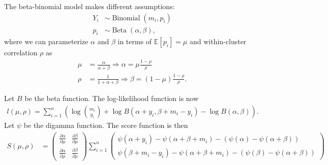 \documentclass[11pt, letterpaper]{article}
\begin{document}
\begin{enumerate}[(a)]
\begin{description}
  The beta-binomial model makes different assumptions:
  \begin{align*}
    Y_{i}
    &\sim \operatorname{Binomial}\left(m_i, p_i\right) \\
    p_i
    &\sim \operatorname{Beta}\left(\alpha, \beta\right),
  \end{align*}
  where we can parameterize $\alpha$ and $\beta$ in terms of
  $\mathbb{E}\left[p_i\right] = \mu$ and within-cluster correlation $\rho$ as
  \begin{align*}
    \mu &= \frac{\alpha}{\alpha + \beta} \Rightarrow \alpha = \mu\frac{1 - \rho}{\rho} \\
    \rho &= \frac{1}{1 + \alpha + \beta} \Rightarrow \beta = \left(1 - \mu\right)\frac{1 - \rho}{\rho}.
  \end{align*}

  Let $B$ be the beta function. The log-likelihood function is now
  \begin{align*}
    l\left(\mu, \rho\right)
    = \sum_{i=1}^n\left(\log{m_i \choose y_i}
    + \log B\left(\alpha + y_i, \beta + m_i - y_i \right)
    - \log B\left(\alpha, \beta\right)
    \right).
  \end{align*}
  Let $\psi$ be the digamma function. The score function is then
  \begin{align*}
    S\left(\mu,\rho\right)
    &= \begin{pmatrix}
      \frac{\partial\alpha}{\partial\mu} & \frac{\partial\beta}{\partial\mu} \\
      \frac{\partial\alpha}{\partial\rho} & \frac{\partial\beta}{\partial\rho}
    \end{pmatrix}\sum_{i=1}^n\begin{pmatrix}
      \displaystyle
        \psi\left(\alpha + y_i\right)
        -
        \psi\left(\alpha + \beta + m_i\right)
        -
      \left(
        \psi\left(\alpha\right) - \psi\left(\alpha + \beta\right)
      \right) \\
      \displaystyle
        \psi\left(\beta + m_i - y_i \right)
        -
        \psi\left(\alpha + \beta + m_i\right)
        -
      \left(
        \psi\left(\beta\right) - \psi\left(\alpha + \beta\right)
      \right)
    \end{pmatrix}
  \end{align*}


\end{description}
\end{enumerate}
\end{document}
